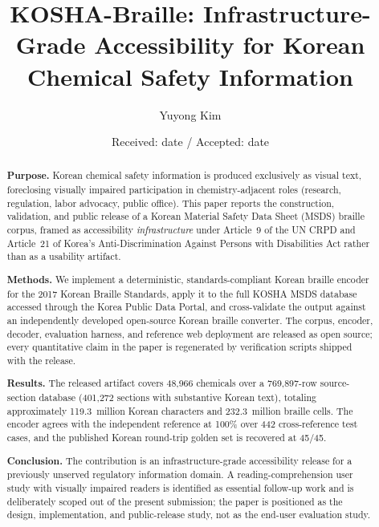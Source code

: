 \documentclass[smallextended]{svjour3}
\begin{document}
\title{KOSHA-Braille: Infrastructure-Grade Accessibility for Korean Chemical Safety Information}


\author{Yuyong Kim}



\date{Received: date / Accepted: date}

\maketitle

\begin{abstract}
\textbf{Purpose.} Korean chemical safety information is produced exclusively as visual text, foreclosing visually impaired participation in chemistry-adjacent roles (research, regulation, labor advocacy, public office). This paper reports the construction, validation, and public release of a Korean Material Safety Data Sheet (MSDS) braille corpus, framed as accessibility \emph{infrastructure} under Article~9 of the UN CRPD and Article~21 of Korea's Anti-Discrimination Against Persons with Disabilities Act rather than as a usability artifact.

\textbf{Methods.} We implement a deterministic, standards-compliant Korean braille encoder for the 2017 Korean Braille Standards, apply it to the full KOSHA MSDS database accessed through the Korea Public Data Portal, and cross-validate the output against an independently developed open-source Korean braille converter. The corpus, encoder, decoder, evaluation harness, and reference web deployment are released as open source; every quantitative claim in the paper is regenerated by verification scripts shipped with the release.

\textbf{Results.} The released artifact covers 48{,}966 chemicals over a 769{,}897-row source-section database (401{,}272 sections with substantive Korean text), totaling approximately 119.3~million Korean characters and 232.3~million braille cells. The encoder agrees with the independent reference at 100\% over 442 cross-reference test cases, and the published Korean round-trip golden set is recovered at 45/45.

\textbf{Conclusion.} The contribution is an infrastructure-grade accessibility release for a previously unserved regulatory information domain. A reading-comprehension user study with visually impaired readers is identified as essential follow-up work and is deliberately scoped out of the present submission; the paper is positioned as the design, implementation, and public-release study, not as the end-user evaluation study.
\end{abstract}
\end{document}
